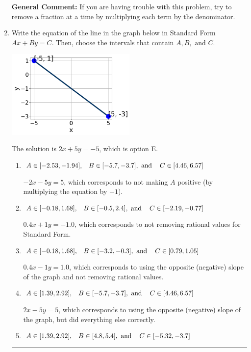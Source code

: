\documentclass{extbook}[14pt]
\newcommand{\litem}[1]{\item #1

\rule{\textwidth}{0.4pt}}
\begin{document}
\begin{enumerate}
{\textbf{General Comment:} If you are having trouble with this problem, try to remove a fraction at a time by multiplying each term by the denominator.
}
\litem{
Write the equation of the line in the graph below in Standard Form $Ax+By=C$. Then, choose the intervals that contain $A, B, \text{ and } C$.

\begin{center}
    \includegraphics[width=0.5\textwidth]{../Figures/linearGraphToStandardCopyB.png}
\end{center}


The solution is \( 2x + 5y = -5 \), which is option E.\begin{enumerate}[label=\Alph*.]
\item \( A \in [-2.53, -1.94], \hspace{3mm} B \in [-5.7, -3.7], \text{ and } \hspace{3mm} C \in [4.46, 6.57] \)

 $-2x - 5y = 5$, which corresponds to not making $A$ positive (by multiplying the equation by $-1$).
\item \( A \in [-0.18, 1.68], \hspace{3mm} B \in [-0.5, 2.4], \text{ and } \hspace{3mm} C \in [-2.19, -0.77] \)

 $0.4x + 1y = -1.0$, which corresponds to not removing rational values for Standard Form.
\item \( A \in [-0.18, 1.68], \hspace{3mm} B \in [-3.2, -0.3], \text{ and } \hspace{3mm} C \in [0.79, 1.05] \)

 $0.4x - 1y = 1.0$, which corresponds to using the opposite (negative) slope of the graph and not removing rational values.
\item \( A \in [1.39, 2.92], \hspace{3mm} B \in [-5.7, -3.7], \text{ and } \hspace{3mm} C \in [4.46, 6.57] \)

 $2x - 5y = 5$, which corresponds to using the opposite (negative) slope of the graph, but did everything else correctly.
\item \( A \in [1.39, 2.92], \hspace{3mm} B \in [4.8, 5.4], \text{ and } \hspace{3mm} C \in [-5.32, -3.7] \)


\end{enumerate}}
\end{enumerate}
\end{document}
